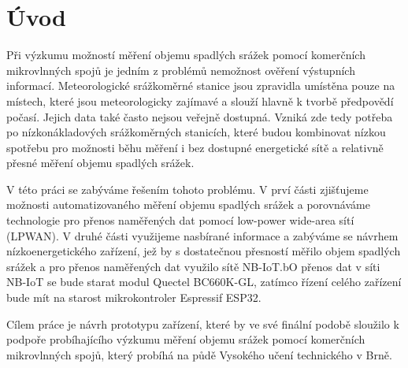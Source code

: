 \chapter*{Úvod}
{}
\par Při výzkumu možností měření objemu spadlých srážek pomocí komerčních mikrovlnných spojů je jedním z problémů nemožnost ověření výstupních informací. Meteorologické srážkoměrné stanice jsou zpravidla umístěna pouze na místech, které jsou meteorologicky zajímavé a slouží hlavně k tvorbě předpovědí počasí. Jejich data také často nejsou veřejně dostupná. Vzniká zde tedy potřeba po nízkonákladových srážkoměrných stanicích, které budou kombinovat nízkou spotřebu pro možnosti běhu měření i bez dostupné energetické sítě a relativně přesné měření objemu spadlých srážek.
\par V této práci se zabýváme řešením tohoto problému. V prví části zjišťujeme možnosti automatizovaného měření objemu spadlých srážek a porovnáváme technologie pro přenos naměřených dat pomocí low-power wide-area sítí (LPWAN). V druhé části využijeme nasbírané informace a zabýváme se návrhem nízkoenergetického zařízení, jež by s dostatečnou přesností měřilo objem spadlých srážek a pro přenos naměřených dat využilo sítě NB-IoT.bO přenos dat v síti NB-IoT se bude starat modul Quectel BC660K-GL, zatímco řízení celého zařízení bude mít na starost mikrokontroler Espressif ESP32.
\par Cílem práce je návrh prototypu zařízení, které by ve své finální podobě sloužilo k podpoře probíhajícího výzkumu měření objemu srážek pomocí komerčních mikrovlnných spojů, který probíhá na půdě Vysokého učení technického v Brně.

